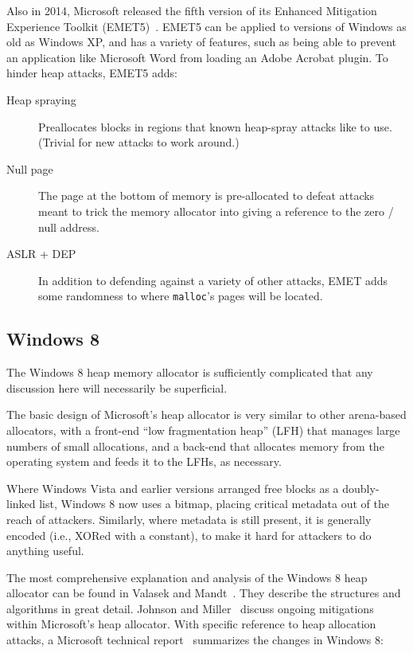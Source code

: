Also in 2014, Microsoft released the fifth version of its Enhanced
Mitigation Experience Toolkit (EMET5)~\cite{metcalf2014}. EMET5 can be
applied to versions of Windows as old as Windows XP, and has a variety
of features, such as being able to prevent an application like Microsoft Word
from loading an Adobe Acrobat plugin. To hinder heap attacks,
EMET5 adds:
\begin{description}
\item [Heap spraying] Preallocates blocks in regions that known
  heap-spray attacks like to use. (Trivial for new attacks to work
  around.)
\item [Null page] The page at the bottom of memory is pre-allocated
  to defeat attacks meant to trick the memory allocator into giving
  a reference to the zero / null address.
\item [ASLR + DEP] In addition to defending against a variety of other
  attacks, EMET adds some randomness to where \texttt{malloc}'s pages
  will be located.
\end{description}

\subsection{Windows 8}
The Windows 8 heap memory allocator is sufficiently complicated that
any discussion here will necessarily be superficial.

The basic design of Microsoft's heap allocator is very similar to
other arena-based allocators, with a front-end ``low fragmentation
heap'' (LFH) that manages large numbers of small allocations, and a
back-end that allocates memory from the operating system and feeds it
to the LFHs, as necessary.

Where Windows Vista and earlier versions arranged free blocks as a
doubly-linked list, Windows 8 now uses a bitmap, placing critical
metadata out of the reach of attackers. Similarly, where metadata is
still present, it is generally encoded (i.e., XORed with a constant),
to make it hard for attackers to do anything useful.

The most comprehensive explanation and analysis of the Windows 8 heap
allocator can be found in Valasek and Mandt~\cite{valasek2012}. They
describe the structures and algorithms in great detail.
%
Johnson and
Miller~\cite{johnson-miller2012} discuss ongoing mitigations within Microsoft's heap allocator.
With specific reference to heap
allocation attacks, a Microsoft
technical report~\cite{microsoft2013} summarizes the changes in
Windows 8:

